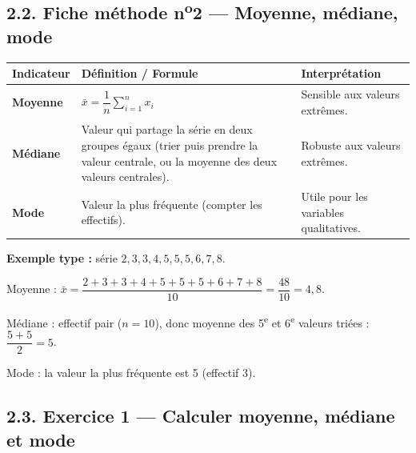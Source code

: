 \documentclass[11pt,a4paper]{article}
\begin{document}
\subsection*{2.2. Fiche méthode n\textsuperscript{o}2 — Moyenne, médiane, mode}

\begin{rappel}
\begin{tabularx}{\linewidth}{|p{2.4cm}|X|p{3.8cm}|}
\hline
\textbf{Indicateur} & \textbf{Définition / Formule} & \textbf{Interprétation} \\
\hline
\textbf{Moyenne} & $\bar{x} = \dfrac{1}{n}\displaystyle\sum_{i=1}^{n} x_i$ & Sensible aux valeurs extrêmes. \\
\hline
\textbf{Médiane} & Valeur qui partage la série en deux groupes égaux (trier puis prendre la valeur centrale, ou la moyenne des deux valeurs centrales). & Robuste aux valeurs extrêmes. \\
\hline
\textbf{Mode} & Valeur la plus fréquente (compter les effectifs). & Utile pour les variables qualitatives. \\
\hline
\end{tabularx}

\vspace{0.2cm}
\textbf{Exemple type :} série $2, 3, 3, 4, 5, 5, 5, 6, 7, 8$.

Moyenne : $\bar{x} = \dfrac{2+3+3+4+5+5+5+6+7+8}{10} = \dfrac{48}{10} = 4{,}8$.

Médiane : effectif pair ($n=10$), donc moyenne des 5\textsuperscript{e} et 6\textsuperscript{e} valeurs triées : $\dfrac{5+5}{2} = 5$.

Mode : la valeur la plus fréquente est 5 (effectif 3).
\end{rappel}

\subsection*{2.3. Exercice 1 — Calculer moyenne, médiane et mode}
\end{document}
